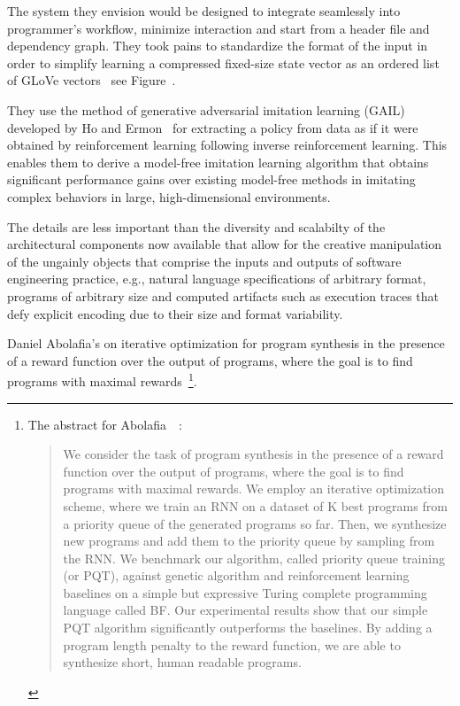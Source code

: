 The system they envision would be designed to integrate seamlessly into programmer's workflow, minimize interaction and start from a header file and dependency graph. They took pains to standardize the format of the input in order to simplify learning a compressed fixed-size state vector as an ordered list of GLoVe vectors~\cite{PenningtonetalEMNLP-14} \emdash{} see Figure~{}.

They use the method of generative adversarial imitation learning (GAIL) developed by Ho and Ermon~\cite{HoandErmonCoRR-16} for extracting a policy from data as if it were obtained by reinforcement learning following inverse reinforcement learning. This enables them to derive a model-free imitation learning algorithm that obtains significant performance gains over existing model-free methods in imitating complex behaviors in large, high-dimensional environments.

The details are less important than the diversity and scalabilty of the architectural components now available that allow for the creative manipulation of the ungainly objects that comprise the inputs and outputs of software engineering practice, e.g., natural language specifications of arbitrary format, programs of arbitrary size and computed artifacts such as execution traces that defy explicit encoding due to their size and format variability.





Daniel Abolafia's {} on iterative optimization for program synthesis in the presence of a reward function over the output of programs, where the goal is to find programs with maximal rewards~\cite{AbolafiaetalCoRR-18}\footnote{%
%
  The abstract for Abolafia~\etal{}~\cite{AbolafiaetalCoRR-18}:
%
  \begin{quotation}
%
    We consider the task of program synthesis in the presence of a reward function over the output of programs, where the goal is to find programs with maximal rewards. We employ an iterative optimization scheme, where we train an RNN on a dataset of K best programs from a priority queue of the generated programs so far. Then, we synthesize new programs and add them to the priority queue by sampling from the RNN. We benchmark our algorithm, called priority queue training (or PQT), against genetic algorithm and reinforcement learning baselines on a simple but expressive Turing complete programming language called BF. Our experimental results show that our simple PQT algorithm significantly outperforms the baselines. By adding a program length penalty to the reward function, we are able to synthesize short, human readable programs.
%
  \end{quotation}}.

